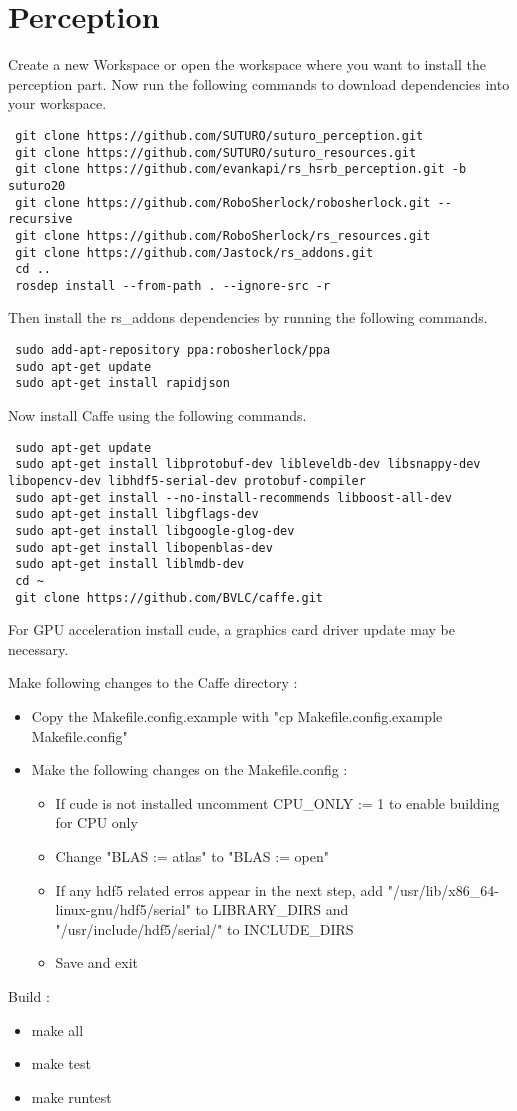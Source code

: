 \documentclass[main.tex]{subfiles}
\begin{document}
 \section{Perception}
 Create a new Workspace or open the workspace where you want to install the perception part. Now run the following commands to download dependencies into your workspace.
 
 \begin{lstlisting}
 git clone https://github.com/SUTURO/suturo_perception.git
 git clone https://github.com/SUTURO/suturo_resources.git 
 git clone https://github.com/evankapi/rs_hsrb_perception.git -b suturo20
 git clone https://github.com/RoboSherlock/robosherlock.git --recursive
 git clone https://github.com/RoboSherlock/rs_resources.git
 git clone https://github.com/Jastock/rs_addons.git
 cd ..
 rosdep install --from-path . --ignore-src -r \end{lstlisting}
 
 Then install the rs\_addons dependencies by running the following commands.
 \begin{lstlisting}
 sudo add-apt-repository ppa:robosherlock/ppa
 sudo apt-get update
 sudo apt-get install rapidjson \end{lstlisting}
 
 Now install Caffe using the following commands.
 \begin{lstlisting}
 sudo apt-get update
 sudo apt-get install libprotobuf-dev libleveldb-dev libsnappy-dev libopencv-dev libhdf5-serial-dev protobuf-compiler
 sudo apt-get install --no-install-recommends libboost-all-dev
 sudo apt-get install libgflags-dev
 sudo apt-get install libgoogle-glog-dev
 sudo apt-get install libopenblas-dev
 sudo apt-get install liblmdb-dev
 cd ~
 git clone https://github.com/BVLC/caffe.git \end{lstlisting}
 
 For GPU acceleration install cude, a graphics card driver update may be necessary.
 
 Make following changes to the Caffe directory : 
 \begin{itemize}
 \item Copy the Makefile.config.example with "cp Makefile.config.example Makefile.config"
 \item Make the following changes on the Makefile.config :
 	\begin{itemize}
 	\item If cude is not installed uncomment CPU\_ONLY := 1 to enable building for CPU only
 	\item Change "BLAS := atlas" to "BLAS := open"
 	\item If any hdf5 related erros appear in the next step, add "/usr/lib/x86\_64-linux-gnu/hdf5/serial" to LIBRARY\_DIRS and "/usr/include/hdf5/serial/" to INCLUDE\_DIRS
 	\item Save and exit
 	\end{itemize}
 	
 \end{itemize}
 Build :
 \begin{itemize}
 \item make all
 \item make test
 \item make runtest
 \end{itemize}
 
\end{document}
